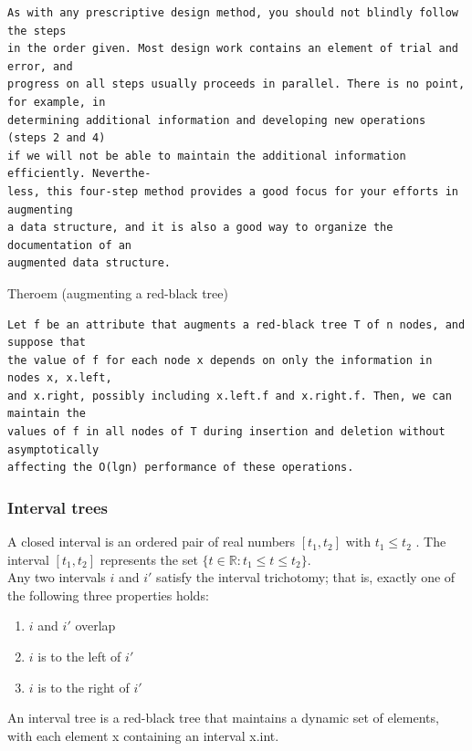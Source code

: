 \documentclass[11pt]{article}
\begin{document}
\begin{verbatim}
As with any prescriptive design method, you should not blindly follow the steps
in the order given. Most design work contains an element of trial and error, and
progress on all steps usually proceeds in parallel. There is no point, for example, in
determining additional information and developing new operations (steps 2 and 4)
if we will not be able to maintain the additional information efficiently. Neverthe-
less, this four-step method provides a good focus for your efforts in augmenting
a data structure, and it is also a good way to organize the documentation of an
augmented data structure.
\end{verbatim}


Theroem (augmenting a red-black tree) \\
\begin{verbatim}
Let f be an attribute that augments a red-black tree T of n nodes, and suppose that
the value of f for each node x depends on only the information in nodes x, x.left,
and x.right, possibly including x.left.f and x.right.f. Then, we can maintain the
values of f in all nodes of T during insertion and deletion without asymptotically
affecting the O(lgn) performance of these operations.
\end{verbatim}

\subsubsection{Interval trees}
\label{sec-4-5-3}
A closed interval is an ordered pair of real numbers $[t_1, t_2]$ with $t_1 \le t_2$ . The interval $[t_1, t_2]$ represents the set $\{t \in \mathbb{R}: t_1 \le t \le t_2\}$. \\

Any two intervals $i$ and $i'$ satisfy the interval trichotomy; that is, exactly one of the following three properties holds: \\
\begin{enumerate}
\item $i$ and $i'$ overlap \\
\item $i$ is to the left of $i'$ \\
\item $i$ is to the right of $i'$ \\
\end{enumerate}

An interval tree is a red-black tree that maintains a dynamic set of elements, with each element x containing an interval x.int. \\
\end{document}
